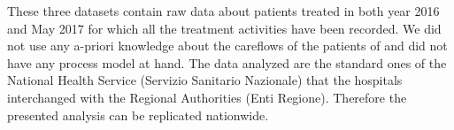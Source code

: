 These three datasets contain raw data about patients treated in both year 2016 and May 2017 for which all the treatment activities have been recorded. We did not use any a-priori knowledge about the careflows of the patients of \hospital and did not have any process model at hand. The data analyzed are the standard ones of the National Health Service (Servizio Sanitario Nazionale) that the hospitals interchanged with the Regional Authorities (Enti Regione). Therefore the presented analysis can be replicated nationwide.%
\newpage

